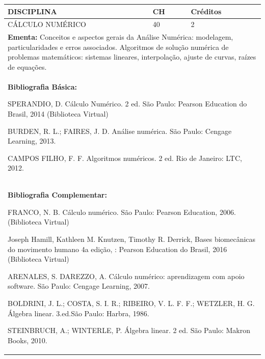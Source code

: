 \documentclass[a4paper, 12pt, openright, oneside, german, french, english, brazil]{abntex2}
\begin{document}
\begin{table}[!h]
  \footnotesize
  \centering
  \begin{tabular}{|p{100mm}|p{10mm}|p{20mm}|}
    \hline
    \textbf{DISCIPLINA} & \textbf{CH} & \textbf{Créditos} \\
    \hline
    CÁLCULO NUMÉRICO & 40 & 2 \\
    \hline
    \multicolumn{3}{|p{130mm}|}{\textbf{Ementa:}  Conceitos e aspectos gerais da Análise Numérica: modelagem, particularidades e erros associados. Algoritmos de solução numérica de problemas matemáticos: sistemas lineares, interpolação, ajuste de curvas, raízes de equações.} \\
    \hline
    \multicolumn{3}{|p{130mm}|}{\textbf{Bibliografia Básica:}

    SPERANDIO, D. Cálculo Numérico. 2 ed. São Paulo: Pearson Education do Brasil,
2014 (Biblioteca Virtual)

BURDEN, R. L.; FAIRES, J. D. Análise numérica. São Paulo: Cengage Learning, 2013.

CAMPOS FILHO, F. F. Algoritmos numéricos. 2 ed. Rio de Janeiro: LTC, 2012.
} \\
    \hline
    \multicolumn{3}{|p{130mm}|}{\textbf{Bibliografia Complementar:}

    FRANCO, N. B. Cálculo numérico. São Paulo: Pearson Education, 2006. (Biblioteca
Virtual)

Joseph Hamill, Kathleen M. Knutzen, Timothy R. Derrick, Bases biomecânicas do
movimento humano 4a edição, : Pearson Education do Brasil, 2016 (Biblioteca Virtual)

ARENALES, S. DAREZZO, A. Cálculo numérico: aprendizagem com apoio software.
São Paulo: Cengage Learning, 2007.

BOLDRINI, J. L.; COSTA, S. I. R.; RIBEIRO, V. L. F. F.; WETZLER, H. G. Álgebra linear. 3.ed.São Paulo: Harbra, 1986.

STEINBRUCH, A.; WINTERLE, P. Álgebra linear. 2 ed. São Paulo: Makron Books, 2010.
} \\
    \hline
  \end{tabular}
\end{table}
\end{document}
